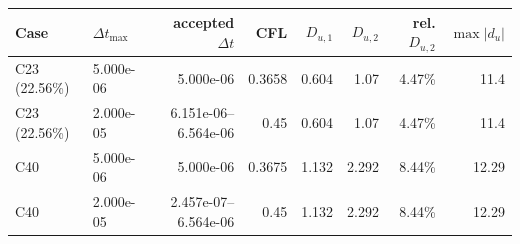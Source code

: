 \begin{tabular}{@{}llrrrrrr@{}}
\toprule
Case & $\Delta t_{\max}$ & accepted $\Delta t$ & CFL & $D_{u,1}$ & $D_{u,2}$ & rel. $D_{u,2}$ & $\max |d_u|$ \\
\midrule
C23 (22.56\%) & 5.000e-06 & 5.000e-06 & 0.3658 & 0.604 & 1.07 & 4.47\% & 11.4 \\
C23 (22.56\%) & 2.000e-05 & 6.151e-06--6.564e-06 & 0.45 & 0.604 & 1.07 & 4.47\% & 11.4 \\
C40 & 5.000e-06 & 5.000e-06 & 0.3675 & 1.132 & 2.292 & 8.44\% & 12.29 \\
C40 & 2.000e-05 & 2.457e-07--6.564e-06 & 0.45 & 1.132 & 2.292 & 8.44\% & 12.29 \\
\bottomrule
\end{tabular}

